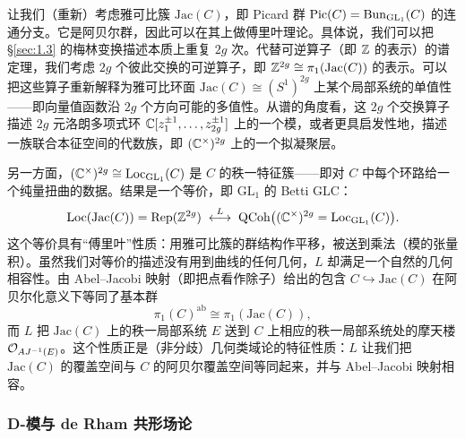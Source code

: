 让我们（重新）考虑雅可比簇 $\mathrm{Jac}(C)$，即 Picard 群 $\mathrm{Pic}(C)=\operatorname{Bun}_{\mathrm{GL}_{1}}(C)$ 的连通分支。它是阿贝尔群，因此可以在其上做傅里叶理论。具体说，我们可以把 \S\ref{sec:1.3} 的梅林变换描述本质上重复 $2g$ 次。代替可逆算子（即 $\mathbb{Z}$ 的表示）的谱定理，我们考虑 $2g$ 个彼此交换的可逆算子，即 $\mathbb{Z}^{2g}\cong\pi_{1}(\mathrm{Jac}(C))$ 的表示。可以把这些算子重新解释为雅可比环面 $\mathrm{Jac}(C)\cong(S^{1})^{2g}$ 上某个局部系统的单值性——即向量值函数沿 $2g$ 个方向可能的多值性。从谱的角度看，这 $2g$ 个交换算子描述 $2g$ 元洛朗多项式环 $\mathbb{C}[z_{1}^{\pm1},\dots,z_{2g}^{\pm1}]$ 上的一个模，或者更具启发性地，描述一族联合本征空间的代数族，即 $(\mathbb{C}^{\times})^{2g}$ 上的一个拟凝聚层。

另一方面，$(\mathbb{C}^{\times})^{2g}\cong\operatorname{Loc}_{\mathrm{GL}_{1}}(C)$ 是 $C$ 的秩一特征簇——即对 $C$ 中每个环路给一个纯量扭曲的数据。结果是一个等价，即 $\mathrm{GL}_{1}$ 的 Betti GLC：
\[
\operatorname{Loc}(\mathrm{Jac}(C))=\operatorname{Rep}(\mathbb{Z}^{2g})\;\overset{L}{\longleftrightarrow}\;\operatorname{QCoh}\bigl((\mathbb{C}^{\times})^{2g}=\operatorname{Loc}_{\mathrm{GL}_{1}}(C)\bigr).
\]
这个等价具有“傅里叶”性质：用雅可比簇的群结构作平移，被送到乘法（模的张量积）。虽然我们对等价的描述没有用到曲线的任何几何，$L$ 却满足一个自然的几何相容性。由 Abel–Jacobi 映射（即把点看作除子）给出的包含 $C\hookrightarrow \mathrm{Jac}(C)$ 在阿贝尔化意义下等同了基本群
\[
\pi_{1}(C)^{\mathrm{ab}}\cong\pi_{1}(\mathrm{Jac}(C)),
\]
而 $L$ 把 $\mathrm{Jac}(C)$ 上的秩一局部系统 $E$ 送到 $C$ 上相应的秩一局部系统处的摩天楼 $\mathcal{O}_{AJ^{-1}(E)}$。这个性质正是（非分歧）几何类域论的特征性质：$L$ 让我们把 $\mathrm{Jac}(C)$ 的覆盖空间与 $C$ 的阿贝尔覆盖空间等同起来，并与 Abel–Jacobi 映射相容。

\subsubsection{D-模与 de Rham 共形场论}\label{sec:2.4.1}

